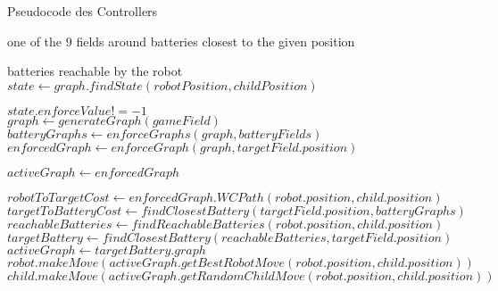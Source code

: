 \begin{algorithm}[H]
	\caption{Pseudocode des Controllers}\label{alg:controllerPseudo}
	\begin{algorithmic}[1]
		
		\Return one of the 9 fields around batteries closest to the given position
		\EndProcedure
		\\
		
		\Return batteries reachable by the robot
		\EndProcedure
		\\
			\State $state \gets graph.findState(robotPosition, childPosition)$
			
			\Return $state.enforceValue != -1$
		\EndProcedure
		\\
		
			\State $graph \gets generateGraph(gameField)$
			\State $batteryGraphs \gets enforceGraphs(graph, batteryFields)$
			\\
					\State $enforcedGraph \gets enforceGraph(graph, targetField.position)$ 
					
					\State $activeGraph \gets enforcedGraph$
					\\
					
					\State $robotToTargetCost \gets enforcedGraph.WCPath(robot.position, child.position)$
					\State $targetToBatteryCost \gets findClosestBattery(targetField.position, batteryGraphs)$
					\\
						\State $reachableBatteries \gets findReachableBatteries(robot.position, child.position)$
						\State $targetBattery \gets findClosestBattery(reachableBatteries, targetField.position)$
						\State $activeGraph \gets targetBattery.graph$
					\EndIf
					\\
					\State $robot.makeMove(activeGraph.getBestRobotMove(robot.position, child.position))$
					\State $child.makeMove(activeGraph.getRandomChildMove(robot.position, child.position))$
					
					\EndWhile
				\EndFor
			\EndWhile
		\EndProcedure
	\end{algorithmic}
\end{algorithm}


